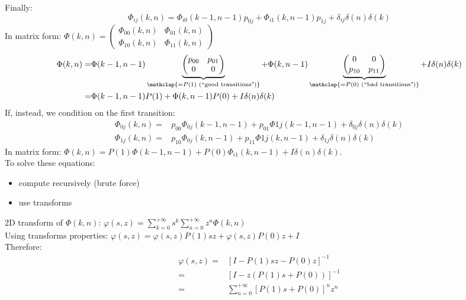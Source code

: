 Finally:
$$\Phi_{ij}(k,n) =  \Phi_{i0}(k-1,n-1)p_{0j} + \Phi_{i1}(k,n-1)p_{1j} + \delta_{ij}\delta(n)\delta(k)$$
In matrix form: $\Phi(k,n) = \begin{pmatrix} \Phi_{00}(k,n)&\Phi_{01}(k,n)\\ \Phi_{10}(k,n)&\Phi_{11}(k,n)\end{pmatrix}$
\begin{equation}
	\begin{split}
			\Phi(k,n) =	 & \Phi(k-1,n-1)\underbrace{\begin{pmatrix} p_{00}&p_{01}\\0&0 \end{pmatrix}}_{\mathclap{= P(1)\text{ (``good transitions")}}} + \Phi(k,n-1)\underbrace{\begin{pmatrix} 0&0\\ p_{10}&p_{11}\end{pmatrix}}_{\mathclap{=P(0)\text{ (``bad transitions")}}} + I\delta(n)\delta(k)\\
								= & \Phi(k-1,n-1)P(1) + \Phi(k,n-1)P(0) + I\delta(n)\delta(k)
	\end{split}
\end{equation}
If, instead, we condition on the first transition:
\begin{align*}
\Phi_{0j}(k,n) =& p_{00}\Phi_{0j}(k-1, n-1) + p_{01}\Phi{1j}(k-1,n-1) + \delta_{0j}\delta(n)\delta(k)  \\
\Phi_{1j}(k,n) =& p_{10}\Phi_{0j}(k, n-1) + p_{11}\Phi{1j}(k,n-1) + \delta_{1j}\delta(n)\delta(k)
\end{align*}
In matrix form: $\Phi(k,n) = P(1)\Phi(k-1,n-1) + P(0)\Phi_{i1}(k,n-1) + I\delta(n)\delta(k)$.\\
To solve these equations:
\begin{itemize}
	\item compute recursively (brute force)
	\item use transforms
\end{itemize}
2D transform of $\Phi(k,n)$: $\varphi(s,z) = \sum\limits_{k=0}^{+\infty}s^k\sum\limits_{n=0}^{+\infty}z^n\Phi(k,n)$ \\
Using transforms properties: $\varphi(s,z) = \varphi(s,z)P(1)sz + \varphi(s,z)P(0)z + I $ \\
Therefore:
\begin{equation}
\begin{split}
	\varphi(s,z) = & [I - P(1)sz -P(0)z ]^{-1} \\
							 = & [I - z(P(1)s + P(0))]^{-1} \\
							 = & \sum\limits_{n=0}^{+\infty}[P(1)s + P(0)]^n z^n
\end{split}
\end{equation}
